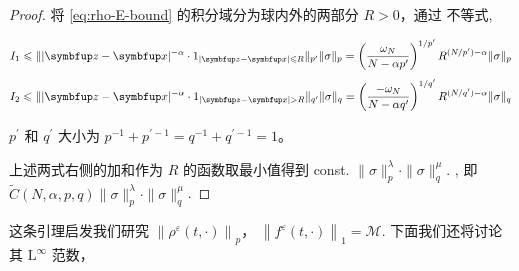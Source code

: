 \begin{proof}
    将 \eqref{eq:rho-E-bound} 的积分域分为球内外的两部分 $R>0$，通过  \Holder 不等式,
    
$$
I_{1} \leqslant  \| |\vect{z}-\vx|^{-\alpha}\cdot 1_{|\vect{z}-\vx|\leqslant R}\|_{p^{\prime}} \|\sigma\|_{p}
= \left(\frac{\omega_N}{N-\alpha p^\prime}\right)^{1/p^\prime} R^{(N / p^{\prime})-\alpha} \|\sigma\|_{p}
$$
$$
I_{2} \leqslant  \| |\vect{z}-\vx|^{-\alpha}\cdot 1_{|\vect{z}-\vx|> R}\|_{q^{\prime}} \|\sigma\|_{q}
= \left(\frac{-\omega_N}{N-\alpha q^\prime}\right)^{1/q^\prime} R^{(N / q^{\prime})-\alpha} \|\sigma\|_{q}
$$

$p^{\prime}$ 和 $q^{\prime}$ 大小为 $p^{-1}+p^{\prime-1}=q^{-1}+q^{\prime-1}=1$。

上述两式右侧的加和作为 $R$ 的函数取最小值得到 const. $\|\sigma\|_{p}^{\lambda} \cdot\|\sigma\|_{q}^{\mu} .$ , 即 $\tilde{C}(N,\alpha, p, q)\|\sigma\|_{p}^{\lambda} \cdot\|\sigma\|_{q}^{\mu}  $.
\end{proof}

这条引理启发我们研究 $\left\| \rho^{\varepsilon}(t, \cdot)\right\|_{p}$，   $\left\|f^{\varepsilon}(t, \cdot)\right\|_{1}=\mathcal{M}.$ 下面我们还将讨论其 $\mathrm{L}^{\infty}$ 范数，







